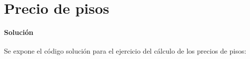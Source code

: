 \section{Precio de pisos}
  
  \paragraph{Solución}
  Se expone el código solución para el ejercicio 
  del cálculo de los precios de pisos:
  
  
